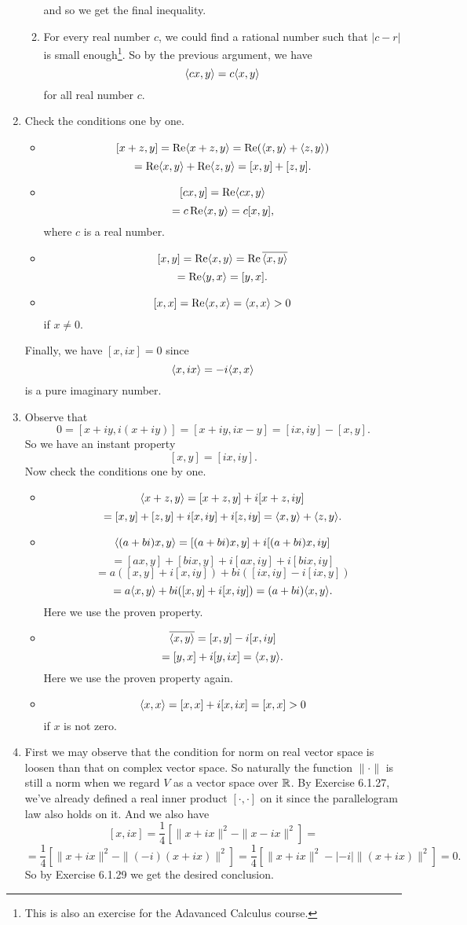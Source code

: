 \begin{enumerate}
\begin{enumerate}
and so we get the final inequality.
\item For every real number $c$, we could find a rational number such that $|c-r|$ is small enough\footnote{This is also an exercise for the Adavanced Calculus course.}. So by the previous argument, we have 
\[\langle cx,y\rangle =c\langle x,y\rangle \]
for all real number $c$.
\end{enumerate}
\item Check the conditions one by one. \begin{itemize}
\item \[[x+z,y]=\operatorname{Re}\langle x+z,y\rangle =\operatorname{Re}(\langle x,y\rangle +\langle z,y\rangle)\]
\[=\operatorname{Re}\langle x,y\rangle +\operatorname{Re}\langle z,y\rangle =[x,y]+[z,y].\]
\item \[[cx,y]=\operatorname{Re}\langle cx,y\rangle \]
\[=c\operatorname{Re}\langle x,y\rangle =c[x,y],\]
where $c$ is a real number.
\item \[[x,y]=\operatorname{Re}\langle x,y\rangle =\operatorname{Re}\overline{\langle x,y\rangle }\]
\[=\operatorname{Re}\langle y,x\rangle =[y,x].\]
\item \[[x,x]=\operatorname{Re}\langle x,x\rangle =\langle x,x\rangle >0\]
if $x\neq 0$.
\end{itemize}
Finally, we have $[x,ix]=0$ since 
\[\langle x,ix\rangle =-i\langle x,x\rangle \]
is a pure imaginary number.
\item Observe that 
\[0=[x+iy,i(x+iy)]=[x+iy,ix-y]=[ix,iy]-[x,y].\]
So we have an instant property 
\[[x,y]=[ix,iy].\]
Now check the conditions one by one. \begin{itemize}
\item \[\langle x+z,y\rangle =[x+z,y]+i[x+z,iy]\]
\[=[x,y]+[z,y]+i[x,iy]+i[z,iy]=\langle x,y\rangle +\langle z,y\rangle .\]
\item \[\langle (a+bi)x,y\rangle =[(a+bi)x,y]+i[(a+bi)x,iy]\]
\[=[ax,y]+[bix,y]+i[ax,iy]+i[bix,iy]\]
\[=a([x,y]+i[x,iy])+bi([ix,iy]-i[ix,y])\]
\[=a\langle x,y\rangle +bi([x,y]+i[x,iy])=(a+bi)\langle x,y\rangle .\]
Here we use the proven property.
\item \[\overline{\langle x,y\rangle}=[x,y]-i[x,iy]\]
\[=[y,x]+i[y,ix]=\langle x,y\rangle .\]
Here we use the proven property again.
\item \[\langle x,x\rangle =[x,x]+i[x,ix]=[x,x]>0\]
if $x$ is not zero.
\end{itemize}
\item First we may observe that the condition for norm on real vector space is loosen than that on complex vector space. So naturally the function $\|\cdot \|$ is still a norm when we regard $V$ as a vector space over $\mathbb{R}$. By Exercise 6.1.27, we've already defined a real inner product $[\cdot ,\cdot ]$ on it since the parallelogram law also holds on it. And we also have 
\[[x,ix]=\frac{1}{4}[\|x+ix\|^2-\|x-ix\|^2]=\]
\[=\frac{1}{4}[\|x+ix\|^2-\|(-i)(x+ix)\|^2]=\frac{1}{4}[\|x+ix\|^2-|-i|\|(x+ix)\|^2]=0.\]
So by Exercise 6.1.29 we get the desired conclusion.
\end{enumerate}
